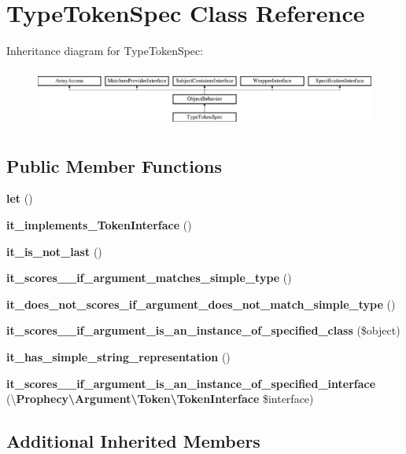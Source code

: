 \section{Type\+Token\+Spec Class Reference}
\label{classspec_1_1_prophecy_1_1_argument_1_1_token_1_1_type_token_spec}
Inheritance diagram for Type\+Token\+Spec\+:\begin{figure}[H]
\begin{center}
\leavevmode
\includegraphics[height=1.953488cm]{classspec_1_1_prophecy_1_1_argument_1_1_token_1_1_type_token_spec}
\end{center}
\end{figure}
\subsection*{Public Member Functions}
\begin{DoxyCompactItemize}
\item 
{\bf let} ()
\item 
{\bf it\+\_\+implements\+\_\+\+Token\+Interface} ()
\item 
{\bf it\+\_\+is\+\_\+not\+\_\+last} ()
\item 
{\bf it\+\_\+scores\+\_\+\_\+if\+\_\+argument\+\_\+matches\+\_\+simple\+\_\+type} ()
\item 
{\bf it\+\_\+does\+\_\+not\+\_\+scores\+\_\+if\+\_\+argument\+\_\+does\+\_\+not\+\_\+match\+\_\+simple\+\_\+type} ()
\item 
{\bf it\+\_\+scores\+\_\+\_\+if\+\_\+argument\+\_\+is\+\_\+an\+\_\+instance\+\_\+of\+\_\+specified\+\_\+class} (\$object)
\item 
{\bf it\+\_\+has\+\_\+simple\+\_\+string\+\_\+representation} ()
\item 
{\bf it\+\_\+scores\+\_\+\_\+if\+\_\+argument\+\_\+is\+\_\+an\+\_\+instance\+\_\+of\+\_\+specified\+\_\+interface} (\textbackslash{}{\bf Prophecy\textbackslash{}\+Argument\textbackslash{}\+Token\textbackslash{}\+Token\+Interface} \$interface)
\end{DoxyCompactItemize}
\subsection*{Additional Inherited Members}


